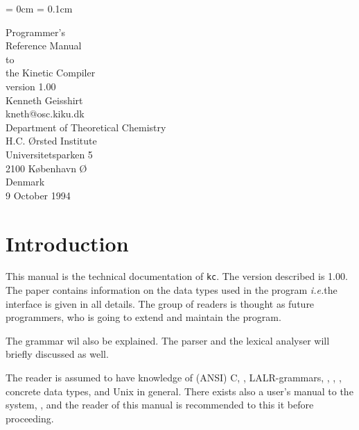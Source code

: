 
\parindent = 0cm
\parskip = 0.1cm

\newcommand{\ie}{{\em i.e.\/}}
\newcommand{\eg}{{\em e.g.\/}}
\newcommand{\etc}{{\em etc.\/}}





\begin{titlepage}
\begin{center}
\vspace{7cm}
{\Huge Programmer's \\ Reference Manual \\ to \\ the Kinetic Compiler \\
  version 1.00} \\
\vspace{2cm}
{\Large Kenneth Geisshirt \\ 
{\normalsize kneth@osc.kiku.dk} \\
Department of Theoretical Chemistry \\
H.C. {\O}rsted Institute \\
Universitetsparken 5 \\
2100 K{\o}benhavn {\O} \\
Denmark } \\
\vspace{3cm}
{\Large 9 October 1994}
\end{center}
\end{titlepage}


\tableofcontents
\newpage

\section{Introduction}
This manual is the technical documentation of {\tt kc}. The version 
described is 1.00. The paper contains information on the data types 
used in the program \ie the interface is given in all details. The group
of readers is thought as future programmers, who is going to extend
and maintain the program. 

The grammar wil also be explained. The parser and the 
lexical analyser will briefly discussed as well.

The reader is assumed to have knowledge of (ANSI) C, \cite{KR}, 
LALR-grammars, \cite{ctools}, \cite{dragon}, \cite{LexYacc}, 
concrete data types, \cite{decker} and Unix in general.
There exists also a user's manual to the system, \cite{kc-man}, and
the reader of this manual is recommended to this it before proceeding.


